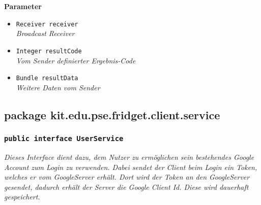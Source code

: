                \textbf{Parameter}
                \begin{itemize}
        		\item\texttt{Receiver receiver}\\ 
                \textit{Broadcast Receiver}\\
				\item\texttt{Integer resultCode}\\ 
                \textit{Vom Sender definierter Ergebnis-Code}\\
                \item\texttt{Bundle resultData}\\ 
                \textit{Weitere Daten vom Sender }\\
                \end{itemize}
        
        \newpage
                
                
		\subsection{package kit.edu.pse.fridget.client.service}
		\subsubsection{\texttt{public interface UserService}}
        \textit{Dieses Interface dient dazu, dem Nutzer zu ermöglichen sein bestehendes Google Account zum Login zu verwenden. Dabei sendet der Client beim Login ein Token, welches er vom GoogleServer erhält. Dort wird der Token an den GoogleServer gesendet, dadurch erhält der Server die Google Client Id. Diese wird dauerhaft gespeichert.}\\
        
